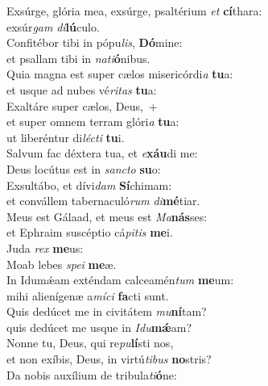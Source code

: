 \evenverse Exsúrge, glória mea, exsúrge, psaltérium \textit{et} \textbf{cí}thara:~\*\\
\evenverse exsúr\textit{gam} \textit{di}\textbf{lú}culo.\\
\oddverse Confitébor tibi in pópu\textit{lis}, \textbf{Dó}mine:~\*\\
\oddverse et psallam tibi in \textit{na}\textit{ti}\textbf{ó}nibus.\\
\evenverse Quia magna est super cælos misericórdi\textit{a} \textbf{tu}a:~\*\\
\evenverse et usque ad nubes vé\textit{ri}\textit{tas} \textbf{tu}a:\\
\oddverse Exaltáre super cælos, Deus,~+\\
\oddverse  et super omnem terram glóri\textit{a} \textbf{tu}a:~\*\\
\oddverse ut liberéntur di\textit{lé}\textit{cti} \textbf{tu}i.\\
\evenverse Salvum fac déxtera tua, et \textit{e}\textbf{xáu}di me:~\*\\
\evenverse Deus locútus est in \textit{san}\textit{cto} \textbf{su}o:\\
\oddverse Exsultábo, et dívi\textit{dam} \textbf{Sí}chimam:~\*\\
\oddverse et convállem tabernaculó\textit{rum} \textit{di}\textbf{mé}tiar.\\
\evenverse Meus est Gálaad, et meus est \textit{Ma}\textbf{nás}ses:~\*\\
\evenverse et Ephraim suscéptio cá\textit{pi}\textit{tis} \textbf{me}i.\\
\oddverse Juda \textit{rex} \textbf{me}us:~\*\\
\oddverse Moab lebes \textit{spe}\textit{i} \textbf{me}æ.\\
\evenverse In Idumǽam exténdam calceamén\textit{tum} \textbf{me}um:~\*\\
\evenverse mihi alienígenæ a\textit{mí}\textit{ci} \textbf{fa}cti sunt.\\
\oddverse Quis dedúcet me in civitátem \textit{mu}\textbf{ní}tam?~\*\\
\oddverse quis dedúcet me usque in \textit{I}\textit{du}\textbf{mǽ}am?\\
\evenverse Nonne tu, Deus, qui re\textit{pu}\textbf{lí}sti nos,~\*\\
\evenverse et non exíbis, Deus, in virtú\textit{ti}\textit{bus} \textbf{no}stris?\\
\oddverse Da nobis auxílium de tribula\textit{ti}\textbf{ó}ne:~\*\\
